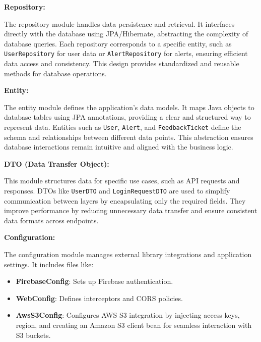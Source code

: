 \documentclass[conference]{IEEEtran}
\begin{document}
\vspace{0.5cm}

\textbf{Repository:}  

The repository module handles data persistence and retrieval. It interfaces directly with the database using JPA/Hibernate, abstracting the complexity of database queries. Each repository corresponds to a specific entity, such as \texttt{UserRepository} for user data or \texttt{AlertRepository} for alerts, ensuring efficient data access and consistency. This design provides standardized and reusable methods for database operations.

\vspace{0.5cm}

\textbf{Entity:}  

The entity module defines the application's data models. It maps Java objects to database tables using JPA annotations, providing a clear and structured way to represent data. Entities such as \texttt{User}, \texttt{Alert}, and \texttt{FeedbackTicket} define the schema and relationships between different data points. This abstraction ensures database interactions remain intuitive and aligned with the business logic.

\vspace{0.5cm}

\textbf{DTO (Data Transfer Object):}  

This module structures data for specific use cases, such as API requests and responses. DTOs like \texttt{UserDTO} and \texttt{LoginRequestDTO} are used to simplify communication between layers by encapsulating only the required fields. They improve performance by reducing unnecessary data transfer and ensure consistent data formats across endpoints.

\vspace{0.5cm}

\textbf{Configuration:}  

The configuration module manages external library integrations and application settings. It includes files like:

\begin{itemize}
    \item \textbf{FirebaseConfig}: Sets up Firebase authentication.
    \item \textbf{WebConfig}: Defines interceptors and CORS policies.
    \item \textbf{AwsS3Config}: Configures AWS S3 integration by injecting access keys, region, and creating an Amazon S3 client bean for seamless interaction with S3 buckets.
\end{itemize}
\end{document}
